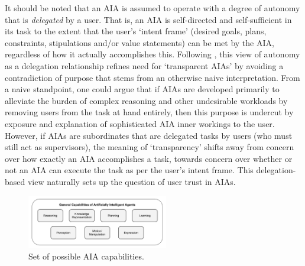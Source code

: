     It should be noted that an AIA is assumed to operate with a degree of autonomy that is \emph{delegated} by a user. That is, an AIA is self-directed and self-sufficient in its task to the extent that the user's `intent frame' (desired goals, plans, constraints, stipulations and/or value statements) can be met by the AIA, regardless of how it actually accomplishes this. %
    Following \citet{Miller2014-av}, this view of autonomy as a delegation relationship refines need for `transparent AIAs' by avoiding a contradiction of purpose that stems from an otherwise naive interpretation. From a naive standpoint, one could argue that if AIAs are developed primarily to alleviate the burden of complex reasoning and other undesirable workloads by removing users from the task at hand entirely, then this purpose is undercut by exposure and explanation of sophisticated AIA inner workings to the user. 
    However, if AIAs are subordinates that are delegated tasks by users (who must still act as supervisors), the meaning of `transparency' shifts away from concern over how exactly an AIA accomplishes a task, towards concern over whether or not an AIA can execute the task as per the user's intent frame. 
    This delegation-based view naturally sets up the question of user trust in AIAs. 

	\begin{figure}[t!]%
    	\centering
     	\includegraphics[width=0.55\textwidth]{Figures/AI_capabilities}
    	\caption{Set of possible AIA capabilities.}
        \label{fig:AIcapabilities}
    \end{figure}

